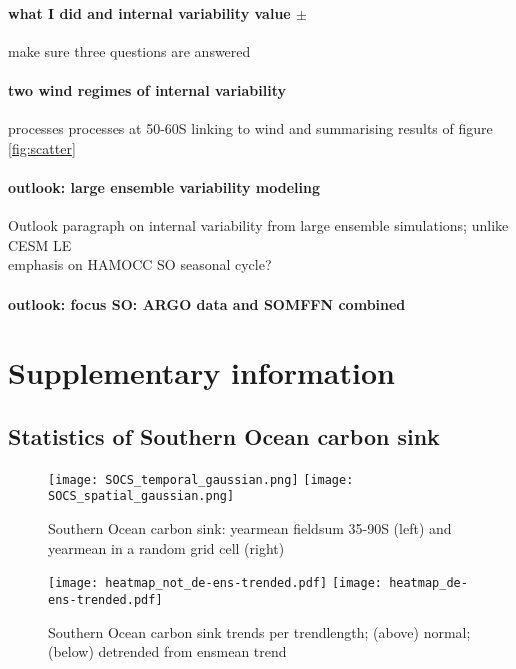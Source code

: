 \documentclass[12pt]{article}
\begin{document}
\paragraph{what I did and internal variability value $\pm$} make sure three questions are answered

\paragraph{two wind regimes of internal variability} processes processes at 50-60S linking to wind and summarising results of figure \ref{fig:scatter}

\paragraph{outlook: large ensemble variability modeling}
Outlook paragraph on internal variability from large ensemble simulations; unlike CESM LE \\ emphasis on HAMOCC SO seasonal cycle?

\paragraph{outlook: focus SO: ARGO data and SOMFFN combined}


\clearpage

\baselineskip18pt
%



\clearpage

\listoffigures

\clearpage

\section*{Supplementary information}

\subsection*{Statistics of Southern Ocean carbon sink}

\begin{figure}[h]
	\texttt{[image: SOCS\_temporal\_gaussian.png]} %
	\texttt{[image: SOCS\_spatial\_gaussian.png]} %
	\caption{Southern Ocean carbon sink: yearmean fieldsum 35-90S (left) and yearmean in a random grid cell (right)}
	\label{fig:SOCS_temporal_gaussian}
\end{figure}

\begin{figure}[h]
	\texttt{[image: heatmap\_not\_de-ens-trended.pdf]} %
	\texttt{[image: heatmap\_de-ens-trended.pdf]} %
\caption{Southern Ocean carbon sink trends per trendlength; (above) normal; (below) detrended from ensmean trend}
	\label{fig:heatmap}
\end{figure}
\end{document}
